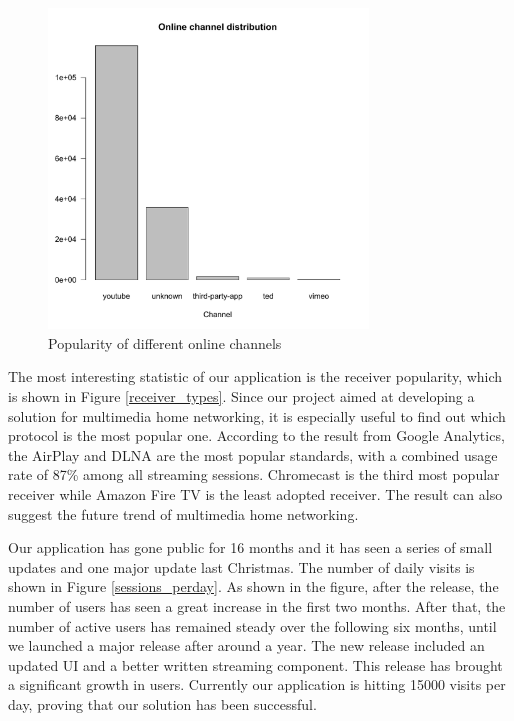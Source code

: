 \begin{figure}[htb]
\centering \includegraphics[height=8.5cm]{charts/online_channel}
\caption{Popularity of different online channels \label{online_channel}}
\end{figure}

The most interesting statistic of our application is the receiver popularity,
which is shown in Figure \ref{receiver_types}. Since our project aimed at
developing a solution for multimedia home networking, it is especially useful
to find out which protocol is the most popular one. According to the result
from Google Analytics, the AirPlay and DLNA are the most popular standards,
with a combined   usage rate of 87\% among all streaming sessions. Chromecast
is the third most popular receiver while Amazon Fire TV is the least adopted
receiver. The result can also suggest the future trend of multimedia home
networking.

Our application has gone public for 16 months and it has seen a series of small
updates and one major update last Christmas. The number of daily visits is
shown in Figure \ref{sessions_perday}. As shown in the figure, after the
release, the number of users has seen a great increase in the first two months.
After that, the number of active users has remained steady over the following
six months, until we launched a major release after around a year. The new
release included an updated UI and a better written streaming component. This
release has brought a significant growth in users. Currently our application is
hitting 15000 visits per day,  proving that our solution has been successful.

